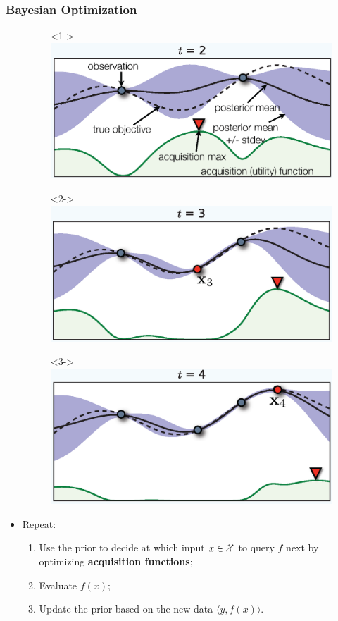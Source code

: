\documentclass[grey]{beamer}
\begin{document}
 \begin{frame}
 \frametitle{Bayesian Optimization}
 \begin{minipage}[l]{0.52\columnwidth}
  \begin{figure}
   \begin{itemize}
    \item[]<1-> \includegraphics[width=0.9\columnwidth]{./figs/bo1}
    \item[]<2-> \includegraphics[width=0.9\columnwidth]{./figs/bo2}
    \item[]<3-> \includegraphics[width=0.9\columnwidth]{./figs/bo3}
   \end{itemize}
  \end{figure}
  \end{minipage}
  \begin{minipage}[r]{0.46\columnwidth}
  \begin{itemize}
  \item Repeat:
   \begin{enumerate}
    \item Use the prior to decide at which input $x \in \cal X$ to query $f$ next
    by optimizing {\bf \textcolor{myColor}{acquisition functions}};
    \item Evaluate $f(x)$;
    \item Update the prior based on the new data 
    $\langle{}y, f(x)\rangle$.
   \end{enumerate} 
  \end{itemize}
  \end{minipage}
 \end{frame}
\end{document}
